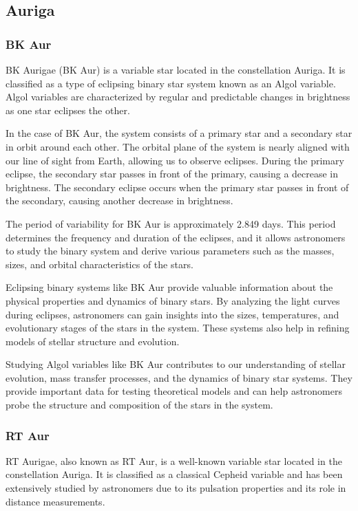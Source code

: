\subsection{Auriga}
\subsubsection*{ BK Aur }
BK Aurigae (BK Aur) is a variable star located in the constellation Auriga. It is classified as a type of eclipsing binary star system known as an Algol variable. Algol variables are characterized by regular and predictable changes in brightness as one star eclipses the other.

In the case of BK Aur, the system consists of a primary star and a secondary star in orbit around each other. The orbital plane of the system is nearly aligned with our line of sight from Earth, allowing us to observe eclipses. During the primary eclipse, the secondary star passes in front of the primary, causing a decrease in brightness. The secondary eclipse occurs when the primary star passes in front of the secondary, causing another decrease in brightness.

The period of variability for BK Aur is approximately 2.849 days. This period determines the frequency and duration of the eclipses, and it allows astronomers to study the binary system and derive various parameters such as the masses, sizes, and orbital characteristics of the stars.

Eclipsing binary systems like BK Aur provide valuable information about the physical properties and dynamics of binary stars. By analyzing the light curves during eclipses, astronomers can gain insights into the sizes, temperatures, and evolutionary stages of the stars in the system. These systems also help in refining models of stellar structure and evolution.

Studying Algol variables like BK Aur contributes to our understanding of stellar evolution, mass transfer processes, and the dynamics of binary star systems. They provide important data for testing theoretical models and can help astronomers probe the structure and composition of the stars in the system.

\subsubsection*{ RT Aur }
RT Aurigae, also known as RT Aur, is a well-known variable star located in the constellation Auriga. It is classified as a classical Cepheid variable and has been extensively studied by astronomers due to its pulsation properties and its role in distance measurements.


